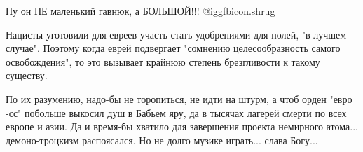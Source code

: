 \begin{itemize}
Ну он НЕ маленький гавнюк, а БОЛЬШОЙ!!! @igg{fbicon.shrug} 


Нацисты уготовили для евреев участь стать удобрениями для полей, "в лучшем
случае". Поэтому когда еврей подвергает "сомнению целесообразность самого
освобождения", то это вызывает крайнюю степень брезгливости к такому существу.


По их разумению, надо-бы не торопиться, не идти на штурм, а чтоб орден "евро
-сс" побольше выкосил душ в Бабьем яру, да в тысячах лагерей смерти по всех
европе и азии. Да и время-бы хватило для завершения проекта немирного
атома... демоно-троцкизм распоясался. Но не долго музике играть... слава Богу...

\end{itemize} %
